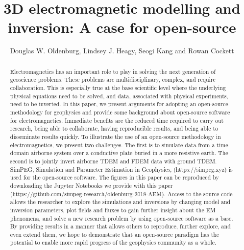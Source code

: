\documentclass[paper]{geophysics}
\begin{document}
\title{3D electromagnetic modelling and inversion: A case for open-source}

\renewcommand{\thefootnote}{\fnsymbol{footnote}}


\address{
\footnotemark[1]Geophyscial Inversion Facility, \\
University of British Columbia, Canada\\
BC, Vancouver}

\author{Douglas W. Oldenburg\footnotemark[1], Lindsey J. Heagy, Seogi Kang and Rowan Cockett}


\maketitle

\begin{abstract}
Electromagnetics has an important role to play in solving the next generation of geoscience problems. These problems are multidisciplinary, complex, and require collaboration. This is especially true at the base scientific level where the underlying physical equations need to be solved, and data, associated with physical experiments, need to be inverted. In this paper, we present arguments for adopting an open-source methodology for geophysics and provide some background about open-source software for electromagnetics. Immediate benefits are the reduced time required to carry out research, being able to collaborate, having reproducible results, and being able to disseminate results quickly. To illustrate the use of an open-source methodology in electromagnetics, we present two challenges. The first is to simulate data from a time domain airborne system over a conductive plate buried in a more resistive earth. The second is to jointly invert airborne TDEM and FDEM data with ground TDEM. SimPEG, Simulation and Parameter Estimation in Geophysics, (https://simpeg.xyz) is used for the open-source software. The figures in this paper can be reproduced by downloading the Jupyter Notebooks we provide with this paper (https://github.com/simpeg-research/oldenburg-2018-AEM). Access to the source code allows the researcher to explore the simulations and inversions by changing model and inversion parameters, plot fields and fluxes to gain further insight about the EM phenomena, and solve a new research problem by using open-source software as a base. By providing results in a manner that allows others to reproduce, further explore, and even extend them, we hope to demonstrate that an open-source paradigm has the potential to enable more rapid progress of the geophysics community as a whole.
\end{abstract}
\end{document}
